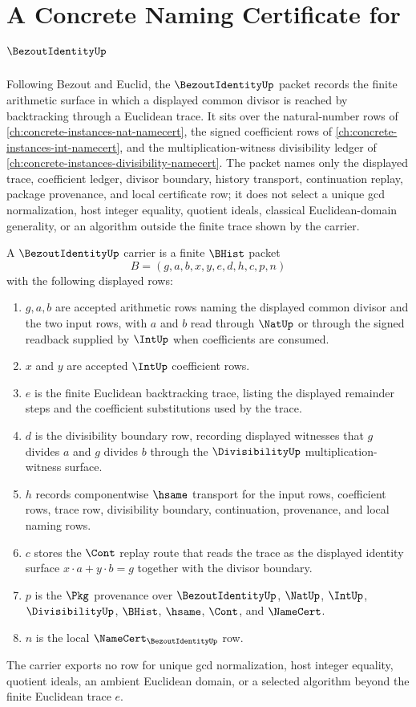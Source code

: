 \chapter{A Concrete Naming Certificate for $\BezoutIdentityUp$}
\label{ch:concrete-instances-bezout-identity-namecert}

Following Bezout and Euclid, the $\BezoutIdentityUp$ packet records the finite arithmetic surface in which a displayed common divisor is reached by backtracking through a Euclidean trace. It sits over the natural-number rows of \autoref{ch:concrete-instances-nat-namecert}, the signed coefficient rows of \autoref{ch:concrete-instances-int-namecert}, and the multiplication-witness divisibility ledger of \autoref{ch:concrete-instances-divisibility-namecert}. The packet names only the displayed trace, coefficient ledger, divisor boundary, history transport, continuation replay, package provenance, and local certificate row; it does not select a unique gcd normalization, host integer equality, quotient ideals, classical Euclidean-domain generality, or an algorithm outside the finite trace shown by the carrier.

\begin{definition}
\label{def:bezout-identity-carrier}
A $\BezoutIdentityUp$ carrier is a finite $\BHist$ packet
$$
B=(g,a,b,x,y,e,d,h,c,p,n)
$$
with the following displayed rows:
\begin{enumerate}
\item $g,a,b$ are accepted arithmetic rows naming the displayed common divisor and the two input rows, with $a$ and $b$ read through $\NatUp$ or through the signed readback supplied by $\IntUp$ when coefficients are consumed.
\item $x$ and $y$ are accepted $\IntUp$ coefficient rows.
\item $e$ is the finite Euclidean backtracking trace, listing the displayed remainder steps and the coefficient substitutions used by the trace.
\item $d$ is the divisibility boundary row, recording displayed witnesses that $g$ divides $a$ and $g$ divides $b$ through the $\DivisibilityUp$ multiplication-witness surface.
\item $h$ records componentwise $\hsame$ transport for the input rows, coefficient rows, trace row, divisibility boundary, continuation, provenance, and local naming rows.
\item $c$ stores the $\Cont$ replay route that reads the trace as the displayed identity surface $x\cdot a+y\cdot b=g$ together with the divisor boundary.
\item $p$ is the $\Pkg$ provenance over $\BezoutIdentityUp$, $\NatUp$, $\IntUp$, $\DivisibilityUp$, $\BHist$, $\hsame$, $\Cont$, and $\NameCert$.
\item $n$ is the local $\NameCert_{\BezoutIdentityUp}$ row.
\end{enumerate}
The carrier exports no row for unique gcd normalization, host integer equality, quotient ideals, an ambient Euclidean domain, or a selected algorithm beyond the finite Euclidean trace $e$.
\end{definition}

